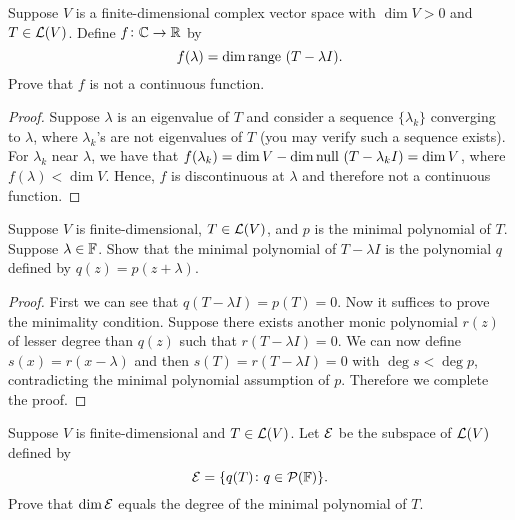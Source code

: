 \documentclass{extarticle}
\begin{document}
\begin{problem}{15}
    Suppose \(V\) is a finite-dimensional complex vector space with \(\dim V > 0\) and \(T \in \mathcal{L}(V)\). 
    Define \(f \colon \mathbb{C} \to \mathbb{R}\) by 
    \[f(\lambda) = \dim \text{range }(T - \lambda I).\]
    Prove that \(f\) is not a continuous function. 
\end{problem}

\begin{proof}
Suppose \(\lambda\) is an eigenvalue of \(T\) and consider a sequence \(\{\lambda_k\}\) converging to \(\lambda\), 
where \(\lambda_k\)'s are not eigenvalues of \(T\) (you may verify such a sequence exists). For \(\lambda_k\) near \(\lambda\), we have that 
\(f(\lambda_k) = \dim V - \dim \text{null } (T - \lambda_k I) = \dim V\), where \(f(\lambda) < \dim V\). Hence, \(f\) 
is discontinuous at \(\lambda\) and therefore not a continuous function. 
\end{proof}


\begin{problem}{17}
    Suppose \(V\) is finite-dimensional, \(T \in \mathcal{L}(V)\), and \(p\) is the minimal polynomial of \(T\). 
    Suppose \(\lambda \in \mathbb{F}\). Show that the minimal polynomial of \(T - \lambda I\) is the polynomial 
    \(q\) defined by \(q(z) = p(z + \lambda)\). 
\end{problem}

\begin{proof}
First we can see that \(q(T - \lambda I) = p(T) = 0\). Now it suffices to prove the minimality condition. 
Suppose there exists another monic polynomial \(r(z)\) of lesser degree than \(q(z)\) such that 
\(r(T - \lambda I) = 0\). We can now define \(s(x) = r(x - \lambda)\) and then 
\(s(T) = r(T - \lambda I) = 0\) with \(\deg s < \deg p\), contradicting the minimal polynomial assumption 
of \(p\). Therefore we complete the proof. 
\end{proof}

\begin{problem}{19}
    Suppose \(V\) is finite-dimensional and \(T \in \mathcal{L}(V)\). Let \(\mathcal{E}\) be the subspace of 
    \(\mathcal{L}(V)\) defined by 
    \[\mathcal{E} = \{q(T) \colon q \in \mathcal{P}(\mathbb{F})\}.\]
    Prove that \(\dim \mathcal{E}\) equals the degree of the minimal polynomial of \(T\).
\end{problem}
\end{document}
